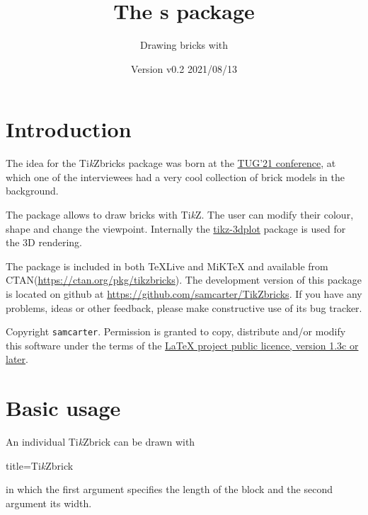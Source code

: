 \documentclass[parskip=half]{scrartcl}
\title{The \tikzbrick{}s package}
\subtitle{Drawing bricks with \TikZ}
\author{%
	\texorpdfstring{
		\begin{tikzpicture}
			 \brick[color=blue]{4}{2}
		\end{tikzpicture}\\[0.8em]		
		\texttt{samcarter}\\
		\url{https://github.com/samcarter/TikZbricks}\\
		\url{https://www.ctan.org/pkg/tikzbricks}
	}{samcarter}}
\date{Version v0.2 \textendash{} 2021/08/13}
\newcommand{\CTAN}{\textsc{CTAN}\xspace}
\newcommand{\TikZ}{Ti\emph{k}Z\xspace}
\newcommand{\miktex}{MiK\TeX\xspace}
\newcommand{\texlive}{\TeX{}Live\xspace}
\newcommand{\tikzbrick}{Ti\emph{k}Zbrick\xspace}
\begin{document}
\maketitle
\thispagestyle{scrheadings}

\section{Introduction}
\label{intro}

The idea for the \tikzbrick{}s package was born at the \href{https://tug.org/tug2021/}{TUG'21 conference}, at which one of the interviewees had a very cool collection of brick models in the background. %

The package allows to draw bricks with \TikZ. The user can modify their colour, shape and change the viewpoint. Internally the \href{https://ctan.org/pkg/tikz-3dplot}{tikz-3dplot} package is used for the 3D rendering. 

The package is included in both \texlive and \miktex and available from \CTAN (\url{https://ctan.org/pkg/tikzbricks}).  
The development version of this package is located on github at \url{https://github.com/samcarter/TikZbricks}. If you have any problems, ideas or other feedback, please make constructive use of its bug tracker.

Copyright  \texttt{samcarter}. Permission is granted to copy, distribute and\slash or modify this software under the terms of the \href{http://www.latex-project.org/lppl.txt}{LaTeX project public licence, version 1.3c or later}.

\section{Basic usage}

An individual \tikzbrick can be drawn with
\begin{tcblisting}{title={\tikzbrick}}
\end{tcblisting}
in which the first argument specifies the length of the block and the second argument its width. 
\end{document}

